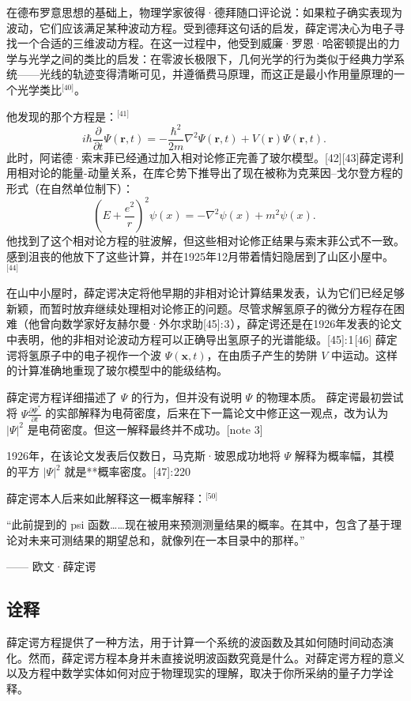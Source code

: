在德布罗意思想的基础上，物理学家彼得·德拜随口评论说：如果粒子确实表现为波动，它们应该满足某种波动方程。受到德拜这句话的启发，薛定谔决心为电子寻找一个合适的三维波动方程。在这一过程中，他受到威廉·罗恩·哈密顿提出的力学与光学之间的类比的启发：在零波长极限下，几何光学的行为类似于经典力学系统——光线的轨迹变得清晰可见，并遵循费马原理，而这正是最小作用量原理的一个光学类比\(^\text{[40]}\)。

他发现的那个方程是：\(^\text{[41]}\)
$$
i\hbar \frac{\partial}{\partial t} \Psi(\mathbf{r}, t) = -\frac{\hbar^2}{2m} \nabla^2 \Psi(\mathbf{r}, t) + V(\mathbf{r}) \Psi(\mathbf{r}, t).~
$$
此时，阿诺德·索末菲已经通过加入相对论修正完善了玻尔模型。[42][43]薛定谔利用相对论的能量-动量关系，在库仑势下推导出了现在被称为克莱因–戈尔登方程的形式（在自然单位制下）：
$$
\left(E + \frac{e^2}{r}\right)^2 \psi(x) = -\nabla^2 \psi(x) + m^2 \psi(x).~
$$
他找到了这个相对论方程的驻波解，但这些相对论修正结果与索末菲公式不一致。感到沮丧的他放下了这些计算，并在1925年12月带着情妇隐居到了山区小屋中。\(^\text{[44]}\)

在山中小屋时，薛定谔决定将他早期的非相对论计算结果发表，认为它们已经足够新颖，而暂时放弃继续处理相对论修正的问题。尽管求解氢原子的微分方程存在困难（他曾向数学家好友赫尔曼·外尔求助[45]: 3 ），薛定谔还是在1926年发表的论文中表明，他的非相对论波动方程可以正确导出氢原子的光谱能级。[45]: 1 [46] 薛定谔将氢原子中的电子视作一个波 $\Psi(\mathbf{x}, t)$，在由质子产生的势阱 $V$ 中运动。这样的计算准确地重现了玻尔模型中的能级结构。

薛定谔方程详细描述了 $\Psi$ 的行为，但并没有说明 $\Psi$ 的物理本质。
薛定谔最初尝试将 $\Psi \frac{\partial \Psi^*}{\partial t}$ 的实部解释为电荷密度，后来在下一篇论文中修正这一观点，改为认为 $|\Psi|^2$ 是电荷密度。但这一解释最终并不成功。[note 3]

1926年，在该论文发表后仅数日，马克斯·玻恩成功地将 $\Psi$ 解释为概率幅，其模的平方 $|\Psi|^2$ 就是**概率密度。[47]: 220 

薛定谔本人后来如此解释这一概率解释：\(^\text{[50]}\)

“此前提到的 psi 函数……现在被用来预测测量结果的概率。在其中，包含了基于理论对未来可测结果的期望总和，就像列在一本目录中的那样。”

—— 欧文·薛定谔
\subsection{诠释}
薛定谔方程提供了一种方法，用于计算一个系统的波函数及其如何随时间动态演化。然而，薛定谔方程本身并未直接说明波函数究竟是什么。对薛定谔方程的意义以及方程中数学实体如何对应于物理现实的理解，取决于你所采纳的量子力学诠释。

